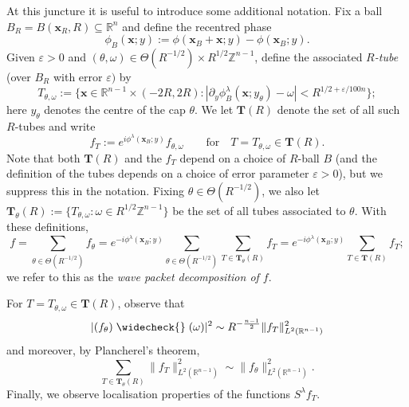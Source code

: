 \documentclass[reqno]{amsart}
\numberwithin{equation}{section}
\newcommand{\R}{\mathbb{R}}
\newcommand{\Z}{\mathbb{Z}}
\newcommand{\bx}{\mathbf{x}}
\newcommand{\bT}{\mathbf{T}}
\theoremstyle{plain}
\theoremstyle{definition}
\begin{document}
At this juncture it is useful to introduce some additional notation. Fix a ball $B_R = B(\bx_R, R) \subseteq \R^n$ and define the recentred phase
\begin{equation*}
    \phi_B(\bx;y) := \phi(\bx_B + \bx;y) - \phi(\bx_B;y).
\end{equation*}
Given $\varepsilon > 0$ and $(\theta, \omega) \in \Theta(R^{-1/2}) \times R^{1/2}\Z^{n-1}$, define the associated \textit{$R$-tube} (over $B_R$ with error $\varepsilon)$ by
\begin{equation}\label{eq: tube}
    T_{\theta,\omega} := \big\{ \bx \in \R^{n-1} \times (-2R, 2R) : |\partial_y \phi_B^{\lambda}(\bx;y_{\theta}) - \omega| < R^{1/2 + \varepsilon/100n} \big\}; 
\end{equation}
here $y_{\theta}$ denotes the centre of the cap $\theta$. We let $\bT(R)$ denote the set of all such $R$-tubes and write 
\begin{equation*}
    f_T := e^{i \phi^{\lambda}(\bx_B;y)} f_{\theta,\omega}  \qquad \textrm{for} \quad T = T_{\theta, \omega} \in \bT(R).
\end{equation*}
Note that both $\bT(R)$ and the $f_T$ depend on a choice of $R$-ball $B$ (and the definition of the tubes depends on a choice of error parameter $\varepsilon > 0$), but we suppress this in the notation. Fixing $\theta \in \Theta(R^{-1/2})$, we also let $\bT_{\theta}(R) := \{T_{\theta, \omega} : \omega \in R^{1/2}\Z^{n-1}\}$ be the set of all tubes associated to $\theta$. With these definitions, 
\begin{equation*}
    f = \sum_{\theta \in \Theta(R^{-1/2})} f_{\theta} = e^{-i \phi^{\lambda}(\bx_B;y)}\sum_{\theta \in \Theta(R^{-1/2})} \sum_{T \in \bT_{\theta}(R)} f_T = e^{-i \phi^{\lambda}(\bx_B;y)}\sum_{T \in \bT(R)} f_T;
\end{equation*}
we refer to this as the \textit{wave packet decomposition of $f$}. 

For $T = T_{\theta, \omega} \in \bT(R)$, observe that
\begin{equation*}%
    |(f_{\theta})\;\widecheck{}\;(\omega)|^2 \sim R^{-\frac{n-1}{2}}\|f_T\|_{L^2(\R^{n-1})}^2
\end{equation*}
and moreover, by Plancherel's theorem, 
\begin{equation}\label{eq: wave packet 3}
  \sum_{T \in \bT_{\theta}(R)} \|f_T\|_{L^2(\R^{n-1})}^2 \sim  \|f_{\theta}\|_{L^2(\R^{n-1})}^2.
\end{equation}
Finally, we observe localisation properties of the functions $S^{\lambda}f_T$.  
\end{document}
